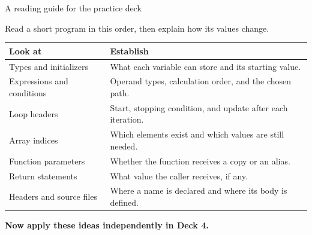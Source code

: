 \documentclass[10pt,aspectratio=169]{beamer}
\newcommand{\intro}[1]{{\small #1\par}}
\begin{document}
\begin{frame}{A reading guide for the practice deck}
\relax
\intro{Read a short program in this order, then explain how its values change.}
\renewcommand{\arraystretch}{1.35}
\begin{tabularx}{\textwidth}{@{}l X@{}}
\toprule
\textbf{Look at} & \textbf{Establish} \\
\midrule
Types and initializers & What each variable can store and its starting value. \\
Expressions and conditions & Operand types, calculation order, and the chosen path. \\
Loop headers & Start, stopping condition, and update after each iteration. \\
Array indices & Which elements exist and which values are still needed. \\
Function parameters & Whether the function receives a copy or an alias. \\
Return statements & What value the caller receives, if any. \\
Headers and source files & Where a name is declared and where its body is defined. \\
\bottomrule
\end{tabularx}\par
\medskip
\textbf{Now apply these ideas independently in Deck 4.}
\end{frame}
\end{document}
